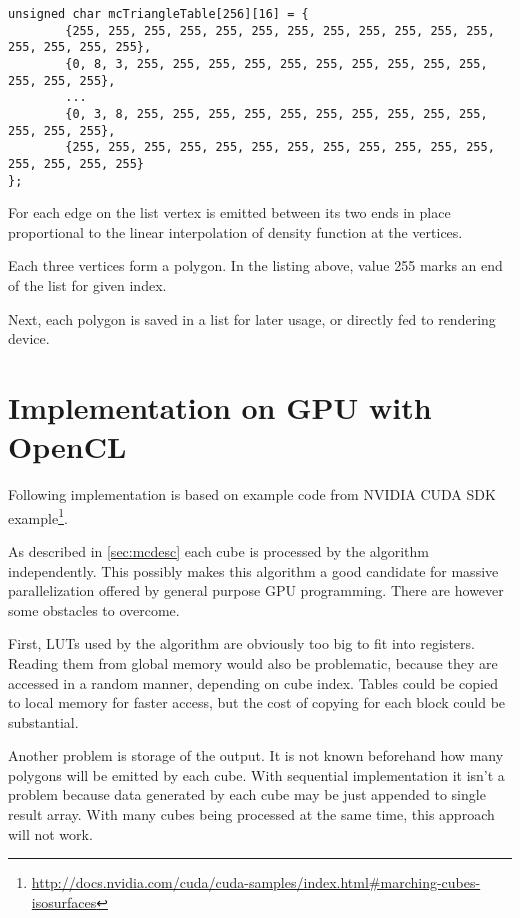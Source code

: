\begin{lstlisting}[caption={Index to edge list LUT. Notice that for indices 0
and 255 no geometry is emitted}]
unsigned char mcTriangleTable[256][16] = {
        {255, 255, 255, 255, 255, 255, 255, 255, 255, 255, 255, 255, 255, 255, 255, 255},
        {0, 8, 3, 255, 255, 255, 255, 255, 255, 255, 255, 255, 255, 255, 255, 255},
        ...
        {0, 3, 8, 255, 255, 255, 255, 255, 255, 255, 255, 255, 255, 255, 255, 255},
        {255, 255, 255, 255, 255, 255, 255, 255, 255, 255, 255, 255, 255, 255, 255, 255}
};
\end{lstlisting}

For each edge on the list vertex is emitted between its two ends in place
proportional to the linear interpolation of density function at the vertices.

Each three vertices form a polygon. In the listing above, value 255 marks an end
of the list for given index.

Next, each polygon is saved in a list for later usage, or directly fed to
rendering device.

\section{Implementation on GPU with OpenCL}
\label{sec:mcgpu}
Following implementation is based on example code from NVIDIA CUDA SDK
example\footnote{\url{http://docs.nvidia.com/cuda/cuda-samples/index.html\#marching-cubes-isosurfaces}}.

As described in \autoref{sec:mcdesc} each cube is processed by the algorithm
independently. This possibly makes this algorithm a good candidate for massive
parallelization offered by general purpose GPU programming. There are however
some obstacles to overcome.

First, LUTs used by the algorithm are obviously too big to fit into registers.
Reading them from global memory would also be problematic, because they are
accessed in a random manner, depending on cube index. Tables could be copied
to local memory for faster access, but the cost of copying for each block could
be substantial.

Another problem is storage of the output. It is not known beforehand how many
polygons will be emitted by each cube. With sequential implementation it isn't a
problem because data generated by each cube may be just appended to single
result array. With many cubes being processed at the same time, this approach
will not work.

